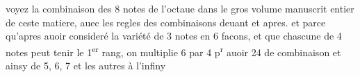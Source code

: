 \documentclass[11pt,a4paper]{article}
\begin{document}
voyez la combinaison des 8 notes de l'octaue dans le gros volume manuscrit entier de ceste matiere, auec les regles des combinaisons deuant et apres. et parce qu'apres auoir consideré la variété de 3 notes en 6 facons, et que chascune de 4 notes peut tenir le 1\textsuperscript{er} rang, on multiplie 6 par 4 p\textsuperscript{r} auoir 24 de combinaison et ainsy de 5, 6, 7 et les autres à l'infiny
\end{document}
